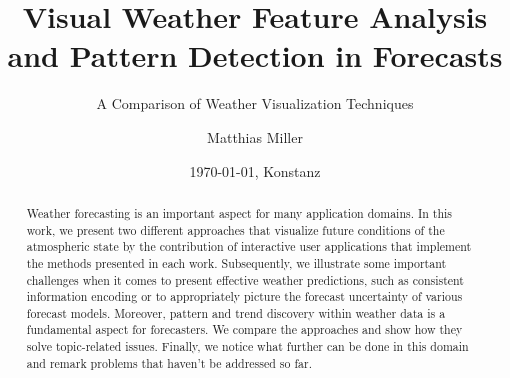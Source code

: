 \documentclass[citeauthoryear]{llncs}
\title{Visual Weather Feature Analysis and Pattern Detection in Forecasts}
\subtitle{A Comparison of Weather Visualization Techniques}
\author{Matthias Miller}
\date{\today{}, Konstanz}
\institute{University of Konstanz, Germany\\
\email{matthias.miller@uni-konstanz.de}}
\begin{document}
\thispagestyle{empty}
\let\cite\parencite

\maketitle              %

\begin{abstract}	
	Weather forecasting is an important aspect for many application domains. In this work, we present two different approaches that visualize future conditions of the atmospheric state by the contribution of interactive user applications that implement the methods presented in each work. Subsequently, we illustrate some important challenges when it comes to present effective weather predictions, such as consistent information encoding or to appropriately picture the forecast uncertainty of various forecast models. Moreover, pattern and trend discovery within weather data is a fundamental aspect for forecasters. We compare the approaches and show how they solve topic-related issues. Finally, we notice what further can be done in this domain and remark problems that haven't be addressed so far.
\end{abstract}
%
\end{document}
